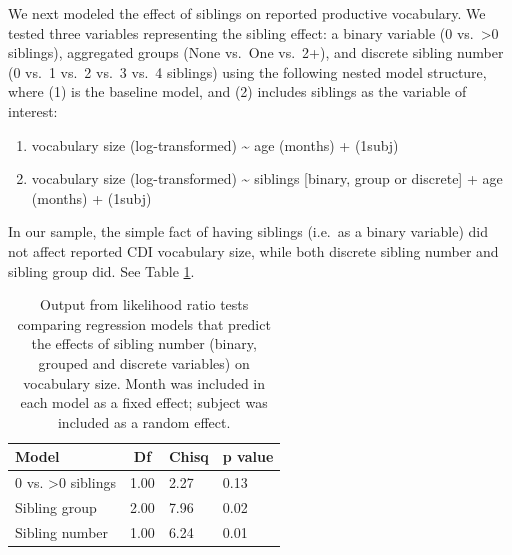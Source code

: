 \documentclass[
  man,floatsintext]{apa6}
\providecommand{\tightlist}{%
  \setlength{\itemsep}{0pt}\setlength{\parskip}{0pt}}
\begin{document}
We next modeled the effect of siblings on reported productive vocabulary. We tested three variables representing the sibling effect: a binary variable (0 vs.~\textgreater0 siblings), aggregated groups (None vs.~One vs.~2+), and discrete sibling number (0 vs.~1 vs.~2 vs.~3 vs.~4 siblings) using the following nested model structure, where (1) is the baseline model, and (2) includes siblings as the variable of interest:

\begin{enumerate}
\def\labelenumi{\arabic{enumi}.}
\tightlist
\item
  vocabulary size (log-transformed) \textasciitilde{} age (months) + (1\textbar subj)
\item
  vocabulary size (log-transformed) \textasciitilde{} siblings {[}binary, group or discrete{]} + age (months) + (1\textbar subj)
\end{enumerate}

In our sample, the simple fact of having siblings (i.e.~as a binary variable) did not affect reported CDI vocabulary size, while both discrete sibling number and sibling group did. See Table \ref{tab:table-sibling-model-output}.

\begin{table}[H]

\begin{center}
\begin{threeparttable}

\caption{\label{tab:table-sibling-model-output}Output from likelihood ratio tests comparing regression models that predict the effects of sibling number (binary, grouped and discrete variables) on vocabulary size. Month was included in each model as a fixed effect; subject was included as a random effect.}

\small{

\begin{tabular}{llll}
\toprule
Model & \multicolumn{1}{c}{Df} & \multicolumn{1}{c}{Chisq} & \multicolumn{1}{c}{p value}\\
\midrule
0 vs. >0 siblings & 1.00 & 2.27 & 0.13\\
Sibling group & 2.00 & 7.96 & 0.02\\
Sibling number & 1.00 & 6.24 & 0.01\\
\bottomrule
\end{tabular}

}

\end{threeparttable}
\end{center}

\end{table}
\end{document}
